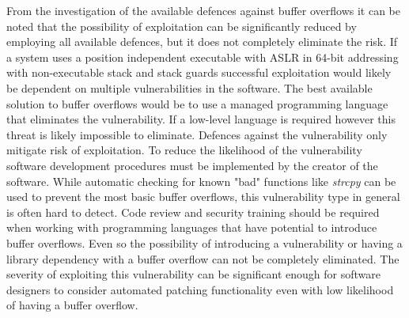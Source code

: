 From the investigation of the available defences against buffer overflows it can be noted that the possibility of exploitation can be significantly reduced by employing all available defences, but it does not completely eliminate the risk. If a system uses a position independent executable with ASLR in 64-bit addressing with non-executable stack and stack guards successful exploitation would likely be dependent on multiple vulnerabilities in the software. The best available solution to buffer overflows would be to use a managed programming language that eliminates the vulnerability. If a low-level language is required however this threat is likely impossible to eliminate. Defences against the vulnerability only mitigate risk of exploitation. To reduce the likelihood of the vulnerability software development procedures must be implemented by the creator of the software. While automatic checking for known "bad" functions like \emph{strcpy} can be used to prevent the most basic buffer overflows, this vulnerability type in general is often hard to detect. Code review and security training should be required when working with programming languages that have potential to introduce buffer overflows. Even so the possibility of introducing a vulnerability or having a library dependency with a buffer overflow can not be completely eliminated. The severity of exploiting this vulnerability can be significant enough for software designers to consider automated patching functionality even with low likelihood of having a buffer overflow.

